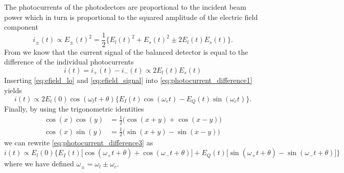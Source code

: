 The photocurrents of the photodectors are proportional to the incident beam power which in turn is proportional to the squared amplitude of the electric field component
\begin{equation}
    i_\pm(t)
    \propto
    E_\pm(t)^2
    =
    \frac{1}{2}
    \bigl\{
        E_l(t)^2+E_s(t)^2\pm 2E_l(t)E_s(t)
    \bigr\}
    \label{eq:photocurrent_individual}.
\end{equation}
From  we know that the current signal of the balanced detector is equal to the difference of the individual photocurrents
\begin{equation}
    i(t)
    =
    i_+(t)-i_-(t)
    \propto
    2E_l(t)E_s(t)
    \label{eq:photocurrent_difference1}
\end{equation}
Inserting \cref{eq:efield_lo} and \cref{eq:efield_signal} into \cref{eq:photocurrent_difference1} yields
\begin{equation}
    i(t)
    \propto
    2E_l(0)\cos(\omega_lt+\theta)\bigl\{E_I(t)\cos(\omega_ct)-E_Q(t)\sin(\omega_ct)\bigr\}
    \label{eq:photocurrent_difference3}.
\end{equation}
Finally, by using the trigonometric identities
\begin{align}
    \cos(x)\cos(y)
    &=
    \frac{1}{2}\bigl(\cos(x+y)+\cos(x-y)\bigr)\\
    \cos(x)\sin(y)
    &=
    \frac{1}{2}\bigl(\sin(x+y)-\sin(x-y)\bigr)
\end{align}
we can rewrite \cref{eq:photocurrent_difference3} as
\begin{equation}
    i(t)
    \propto
    E_l(0)\biggl\{
        E_I(t)\bigl[\cos(\omega_+t+\theta)+\cos(\omega_-t+\theta)\bigr]
        +
        E_Q(t)\bigl[\sin(\omega_+t+\theta)-\sin(\omega_-t+\theta)\bigr]
    \biggr\}
    \label{eq:photocurrent_difference_final}
\end{equation}
where we have defined $\omega_\pm=\omega_l\pm\omega_c$.


